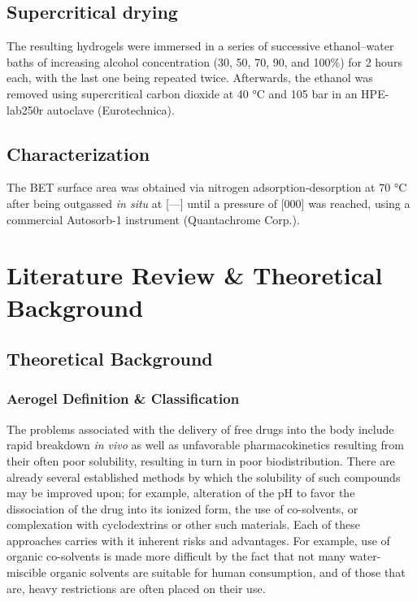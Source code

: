 \documentclass[a4paper,12pt]{article}
\begin{document}
\subsection{Supercritical drying}

The resulting hydrogels were immersed in a series of successive ethanol–water baths of increasing
alcohol concentration (30, 50, 70, 90, and 100\%) for 2 hours each, with the last one being repeated twice. Afterwards, the ethanol was removed using supercritical carbon dioxide at 40 °C and 105 bar in an HPE-lab250r autoclave (Eurotechnica). 

\subsection{Characterization}

The BET surface area was obtained via nitrogen adsorption-desorption at 70 °C after being outgassed \textit{in situ} at [---] until a pressure of [000] was reached, using a commercial Autosorb-1 instrument (Quantachrome Corp.).

\pagebreak

\section{Literature Review \& Theoretical Background}

\subsection{Theoretical Background}

\subsubsection{Aerogel Definition \& Classification}

The problems associated with the delivery of free drugs into the body include rapid breakdown \textit{in vivo} as well as unfavorable pharmacokinetics resulting from their often poor solubility, resulting in turn in poor biodistribution.\supercite{maleki_synthesis_2016} There are already several established methods by which the solubility of such compounds may be improved upon; for example, alteration of the pH to favor the dissociation of the drug into its ionized form, the use of co-solvents, or complexation with cyclodextrins or other such materials. Each of these approaches carries with it inherent risks and advantages. For example, use of organic co-solvents is made more difficult by the fact that not many water-miscible organic solvents are suitable for human consumption, and of those that are, heavy restrictions are often placed on their use.\supercite{aulton_aultons_2013}
\end{document}

